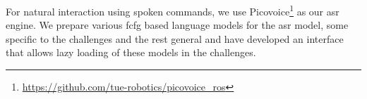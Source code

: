 \label{ssec:speech_recognition}
For natural interaction using spoken commands, we use Picovoice\footnote{\url{https://github.com/tue-robotics/picovoice_ros}} as our \acrfull{asr} engine.
We prepare various \acrfull{fcfg} based language models for the \acrshort{asr} model, some specific to the challenges and the rest general and have developed an interface that allows lazy loading of these models in the challenges.